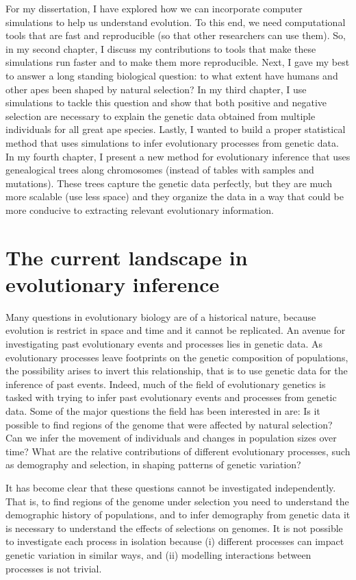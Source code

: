 For my dissertation, I have explored how we can incorporate computer simulations to help us understand evolution.
To this end, we need computational tools that are fast and reproducible (so that other researchers can use them).
So, in my second chapter, I discuss my contributions to tools that make these simulations run faster and to make them more reproducible.
Next, I gave my best to answer a long standing biological question: to what extent have humans and other apes been shaped by natural selection?
In my third chapter, I use simulations to tackle this question and show that both positive and negative selection are necessary to explain the genetic data obtained from multiple individuals for all great ape species.
Lastly, I wanted to build a proper statistical method that uses simulations to infer evolutionary processes from genetic data.
In my fourth chapter, I present a new method for evolutionary inference that uses genealogical trees along chromosomes (instead of tables with samples and mutations).
These trees capture the genetic data perfectly,
but they are much more scalable (use less space) and
they organize the data in a way that could be more conducive to extracting relevant evolutionary information.

\section{The current landscape in evolutionary inference}

Many questions in evolutionary biology are of a historical nature,
because evolution is restrict in space and time and it cannot be replicated.
An avenue for investigating past evolutionary events and processes lies in genetic data.
As evolutionary processes leave footprints on the genetic composition of populations,
the possibility arises to invert this relationship,
that is to use genetic data for the inference of past events.
Indeed, much of the field of evolutionary genetics is tasked with trying to infer past evolutionary events and processes from genetic data.
Some of the major questions the field has been interested in are:
Is it possible to find regions of the genome that were affected by natural selection?
Can we infer the movement of individuals and changes in population sizes over time?
What are the relative contributions of different evolutionary processes, such as demography and selection, in shaping patterns of genetic variation? 


It has become clear that these questions cannot be investigated independently.
That is, to find regions of the genome under selection you need to understand the demographic history of populations,
and to infer demography from genetic data it is necessary to understand the effects of selections on genomes.
It is not possible to investigate each process in isolation because
(i) different processes can impact genetic variation in similar ways,
and (ii) modelling interactions between processes is not trivial.

